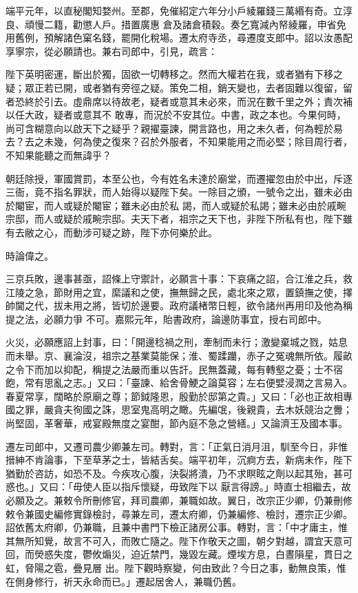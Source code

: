 \begin{pinyinscope}
 端平元年，以直秘閣知婺州。至郡，免催紹定六年分小戶綾羅錢三萬緡有奇。立淳良、頑慢二籍，勸懲人戶。措置廣惠
 倉及諸倉積穀。奏乞寬減內帑綾羅，申省免用舊例，預解諸色窠名錢，罷開化稅場。遷太府寺丞，尋遷度支郎中。詔以汝愚配享寧宗，從必願請也。兼右司郎中，引見，疏言：



 陛下英明密運，斷出於獨，固欲一切轉移之。然而大權若在我，或者猶有下移之疑；眾正若已開，或者猶有旁徑之疑。策免二相，銷天變也，去者固難以復留，留者恐終於引去。虛鼎席以待故老，疑者或意其未必來，而況在數千里之外；責次補以任大政，疑者或意其不
 敢專，而況於不安其位。中書，政之本也。今果何時，尚可含糊意向以啟天下之疑乎？親擢臺諫，開言路也，用之未久者，何為輕於易去？去之未幾，何為使之復來？召於外服者，不知果能用之而必堅；除目周行者，不知果能聽之而無諱乎？



 朝廷除授，軍國賞罰，本至公也，今有姓名未達於廟堂，而遷擢忽由於中出，斥逐三衙，竟不指名罪狀，而人始得以疑陛下矣。一除目之頒，一號令之出，雖未必由於閹宦，而人或疑於閹宦；雖未必由於私
 謁，而人或疑於私謁；雖未必由於戚畹宗邸，而人或疑於戚畹宗邸。夫天下者，祖宗之天下也，非陛下所私有也，陛下雖有去敝之心，而動涉可疑之跡，陛下亦何樂於此。



 時論偉之。



 三京兵敗，邊事甚亟，詔條上守禦計，必願言十事：下哀痛之詔，合江淮之兵，救江陵之急，節財用之宜，縻議和之使，撫無歸之民，處北來之眾，置鎮撫之使，擇帥閫之代，拔未用之將，皆切於邊要。政府議楮幣日輕，欲令諸州再用印及他為稱提之法，必願力爭
 不可。嘉熙元年，貽書政府，論邊防事宜，授右司郎中。



 火災，必願應詔上封事，曰：「開邊稔禍之刑，牽制而未行；激變棄城之戮，姑息而未舉。京、襄淪沒，祖宗之基業莫能保；淮、蜀蹂躪，赤子之冤魂無所依。履畝之令下而加以抑配，稱提之法嚴而重以告訐。民無蓋藏，每有轉壑之憂；士不宿飽，常有思亂之志。」又曰：「臺諫、給舍骨鯁之論莫容；左右便嬖浸潤之言易入。春夏常享，闊略於原廟之尊；節鉞隆恩，殷勤於邸第之貴。」又曰：「必也正故相專
 國之罪，嚴貪夫徇國之誅，思室鬼高明之瞰。先編氓，後親貴，去木妖競治之釁；尚堅固，革奢華，戒宴殿無度之宴酣，節內庭不急之營繕。」又論濟王及國本事。



 遷左司郎中，又遷司農少卿兼左司。轉對，言：「正氣日消月沮，馴至今日，非惟搢紳不肯論事，下至草茅之士，皆結舌矣。端平初年，沉痾方去，新病未作，陛下猶勤於咨訪，如恐不及。今疾攻心腹，決裂將潰，乃不求瞑眩之劑以起其殆，甚可惑也。」又曰：「毋使人臣以指斥懷疑，毋致陛下以
 厭言得謗。」時直士相繼去，故必願及之。兼敕令所刪修官，拜司農卿，兼職如故。翼日，改宗正少卿，仍兼刪修敕令兼國史編修實錄檢討，尋兼左司，遷太府卿，仍兼編修、檢討，遷宗正少卿。詔依舊太府卿，仍兼職，且兼中書門下檢正諸房公事。轉對，言：「中才庸主，惟其無所知覺，故言不可入，而敗亡隨之。陛下作敬天之圖，朝夕對越，謂宜天意可回，而熒惑失度，鬱攸煽災，迫近禁門，幾毀左藏。煙埃方息，白晝隕星，貫日之虹，脅陽之雹，疊見層
 出。陛下觀時察變，何由致此？今日之事，動無良策，惟在側身修行，祈天永命而已。」遷起居舍人，兼職仍舊。




\end{pinyinscope}
